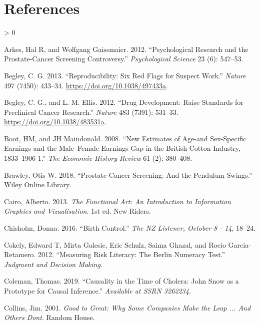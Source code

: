 \documentclass[
  10pt,
  b5paper]{book}
\newlength{\cslhangindent}
\newenvironment{CSLReferences}[2] %
 {%
  \setlength{\parindent}{0pt}
  \ifodd #1 \everypar{\setlength{\hangindent}{\cslhangindent}}\ignorespaces\fi
  \ifnum #2 > 0
  \setlength{\parskip}{#2\baselineskip}
  \fi
 }%
 {}
\begin{document}
\hypertarget{references}{%
\chapter*{References}\label{references}}

\hypertarget{refs}{}
\begin{CSLReferences}{1}{0}
\leavevmode\hypertarget{ref-arkes2012psychological}{}%
Arkes, Hal R, and Wolfgang Gaissmaier. 2012. {``Psychological Research and the Prostate-Cancer Screening Controversy.''} \emph{Psychological Science} 23 (6): 547--53.

\leavevmode\hypertarget{ref-r2_begley_2013}{}%
Begley, C. G. 2013. {``Reproducibility: Six Red Flags for Suspect Work.''} \emph{Nature} 497 (7450): 433--34. \url{https://doi.org/10.1038/497433a}.

\leavevmode\hypertarget{ref-r23_begley_ellis_2012}{}%
Begley, C. G., and L. M. Ellis. 2012. {``Drug Development: Raise Standards for Preclinical Cancer Research.''} \emph{Nature} 483 (7391): 531--33. \url{https://doi.org/10.1038/483531a}.

\leavevmode\hypertarget{ref-boot2008new}{}%
Boot, HM, and JH Maindonald. 2008. {``New Estimates of Age-and Sex-Specific Earnings and the Male--Female Earnings Gap in the British Cotton Industry, 1833--1906 1.''} \emph{The Economic History Review} 61 (2): 380--408.

\leavevmode\hypertarget{ref-brawley2018prostate}{}%
Brawley, Otis W. 2018. {``Prostate Cancer Screening: And the Pendulum Swings.''} Wiley Online Library.

\leavevmode\hypertarget{ref-cairo_2013}{}%
Cairo, Alberto. 2013. \emph{The Functional Art: An Introduction to Information Graphics and Vizualisation}. 1st ed. New Riders.

\leavevmode\hypertarget{ref-chisholm_2016}{}%
Chisholm, Donna. 2016. {``Birth Control.''} \emph{The NZ Listener, October 8 - 14}, 18--24.

\leavevmode\hypertarget{ref-cokely2012measuring}{}%
Cokely, Edward T, Mirta Galesic, Eric Schulz, Saima Ghazal, and Rocio Garcia-Retamero. 2012. {``Measuring Risk Literacy: The Berlin Numeracy Test.''} \emph{Judgment and Decision Making}.

\leavevmode\hypertarget{ref-coleman2019causality}{}%
Coleman, Thomas. 2019. {``Causality in the Time of Cholera: John {S}now as a Prototype for Causal Inference.''} \emph{Available at SSRN 3262234}.

\leavevmode\hypertarget{ref-collins_2001}{}%
Collins, Jim. 2001. \emph{Good to Great: Why Some Companies Make the Leap ... And Others Dont}. Random House.


\end{CSLReferences}
\end{document}
